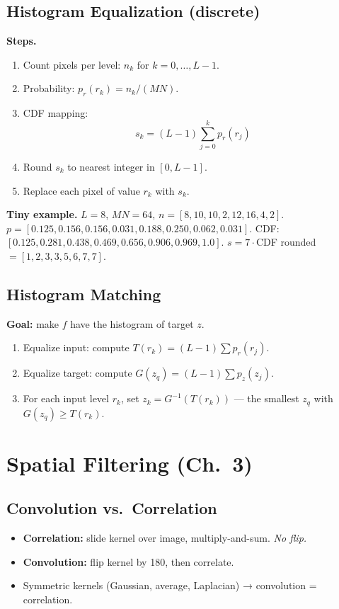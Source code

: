 \documentclass[10pt]{article}
\begin{document}
\subsection{Histogram Equalization (discrete)}
\begin{tcolorbox}[procbox]
\textbf{Steps.}
\begin{enumerate}
  \item Count pixels per level: $n_k$ for $k=0,\dots,L-1$.
  \item Probability: $p_r(r_k) = n_k / (MN)$.
  \item CDF mapping:
  \[
  s_k = (L-1) \sum_{j=0}^{k} p_r(r_j)
  \]
  \item Round $s_k$ to nearest integer in $[0,L-1]$.
  \item Replace each pixel of value $r_k$ with $s_k$.
\end{enumerate}
\end{tcolorbox}

\textbf{Tiny example.} $L=8$, $MN=64$, $n = [8,10,10,2,12,16,4,2]$.
$p = [0.125,0.156,0.156,0.031,0.188,0.250,0.062,0.031]$.
CDF: $[0.125, 0.281, 0.438, 0.469, 0.656, 0.906, 0.969, 1.0]$.
$s = 7\cdot$CDF rounded $= [1,2,3,3,5,6,7,7]$.

\subsection{Histogram Matching}
\begin{tcolorbox}[procbox]
\textbf{Goal:} make $f$ have the histogram of target $z$.
\begin{enumerate}
  \item Equalize input: compute $T(r_k) = (L-1)\sum p_r(r_j)$.
  \item Equalize target: compute $G(z_q) = (L-1)\sum p_z(z_j)$.
  \item For each input level $r_k$, set $z_k = G^{-1}(T(r_k))$ — the smallest $z_q$ with $G(z_q)\ge T(r_k)$.
\end{enumerate}
\end{tcolorbox}

\section{Spatial Filtering (Ch.~3)}

\subsection{Convolution vs.\ Correlation}
\begin{itemize}
  \item \textbf{Correlation:} slide kernel over image, multiply-and-sum. \emph{No flip.}
  \item \textbf{Convolution:} flip kernel by 180\textdegree, then correlate.
  \item Symmetric kernels (Gaussian, average, Laplacian) → convolution = correlation.
\end{itemize}
\end{document}
